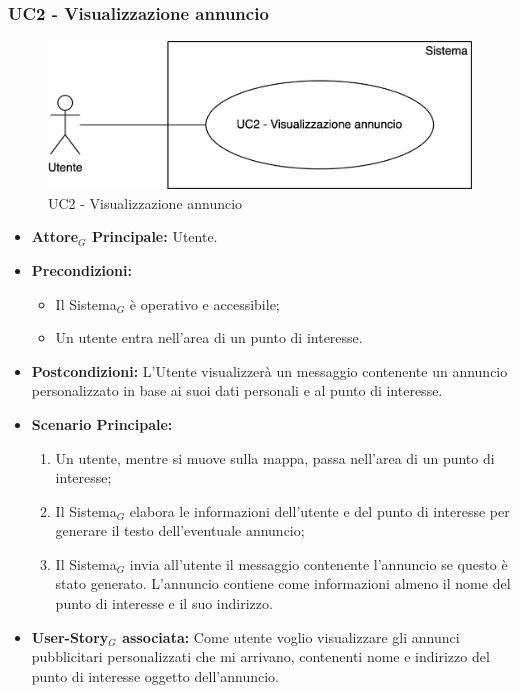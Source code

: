 \documentclass[10pt]{article}
\begin{document}
\begin{justify}
\subsubsection{\textbf{UC2 - Visualizzazione annuncio}}
\begin{figure}[H]
    \centering
    \includegraphics[width=0.7\linewidth]{UC2image.png}
    \caption{UC2 - Visualizzazione annuncio}
    \label{fig:UC2}
\end{figure}
\begin{itemize}
    \item \textbf{Attore$_G$ Principale:} Utente.
    \item \textbf{Precondizioni:} 
        \begin{itemize}
    	\item Il Sistema$_G$ è operativo e accessibile;
    	\item Un utente entra nell'area di un punto di interesse.
        \end{itemize}
    \item \textbf{Postcondizioni:} L'Utente visualizzerà un messaggio contenente un annuncio personalizzato in base ai suoi dati personali e al punto di interesse.
    \item \textbf{Scenario Principale:} 
        \begin{enumerate}
            \item Un utente, mentre si muove sulla mappa, passa nell'area di un punto di interesse;
            \item Il Sistema$_G$ elabora le informazioni dell'utente e del punto di interesse per generare il testo dell'eventuale annuncio;
            \item Il Sistema$_G$ invia all'utente il messaggio contenente l'annuncio se questo è stato generato. L'annuncio contiene come informazioni almeno il nome del punto di interesse e il suo indirizzo.
        \end{enumerate}
    \item \textbf{User-Story$_G$ associata:} Come utente voglio visualizzare gli annunci pubblicitari personalizzati che mi arrivano, contenenti nome e indirizzo del punto di interesse oggetto dell'annuncio.
\end{itemize}

\end{justify}
\end{document}
